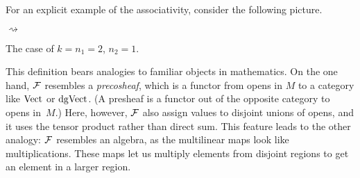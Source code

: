 \documentclass[11pt]{amsart}
\begin{document}
For an explicit example of the associativity, consider the following picture.
\begin{center}
\hspace{-1cm}
\begin{minipage}{3cm}
{\tiny
\begin{center}
\end{center}
}
 \end{minipage}
 \hspace{1.3cm} $\rightsquigarrow$ \hspace{-0.1cm}
\begin{minipage}{8cm}
\end{minipage}

The case of $k=n_1=2$, $n_2 = 1$.
\end{center}

This definition bears analogies to familiar objects in mathematics.
On the one hand, $\mathcal F$ resembles a {\em precosheaf}, which is a functor from opens in $M$ to a category like ${\rm Vect}$ or ${\rm dgVect}$.
(A presheaf is a functor out of the opposite category to opens in~$M$.) 
Here, however, $\mathcal F$ also assign values to disjoint unions of opens, and it uses the tensor product rather than direct sum.
This feature leads to the other analogy: $\mathcal F$ resembles an algebra, as
the multilinear maps look like multiplications.
These maps let us multiply elements from disjoint regions to get an element in a larger region.

\end{document}
